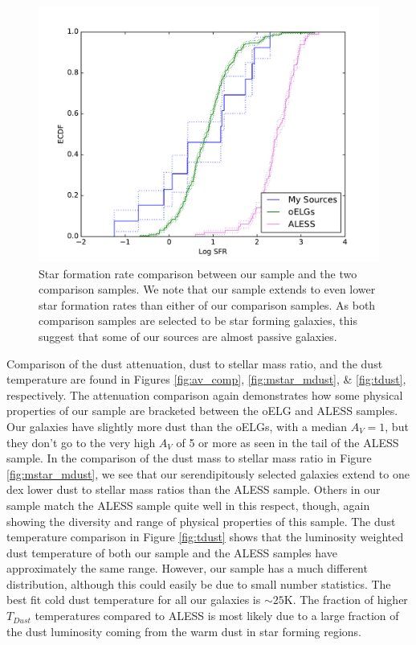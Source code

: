 \documentclass[preprint,natbib209]{aastex}
\begin{document}
\begin{figure}[t]
\centering
\includegraphics[scale=0.8]{ecdf_sfr.pdf}
\caption{Star formation rate comparison between our sample and the two comparison samples. We note that our sample extends to even lower star formation rates than either of our comparison samples. As both comparison samples are selected to be star forming galaxies, this suggest that some of our sources are almost passive galaxies.}
\label{fig:sfr_comp}
\end{figure}

Comparison of the dust attenuation, dust to stellar mass ratio, and the dust temperature are found in Figures \ref{fig:av_comp}, \ref{fig:mstar_mdust}, \& \ref{fig:tdust}, respectively. The attenuation comparison again demonstrates how some physical properties of our sample are bracketed between the oELG and ALESS samples. Our galaxies have slightly more dust than the oELGs, with a median $A_V = 1$, but they don't go to the very high $A_V$ of 5 or more as seen in the tail of the ALESS sample. In the comparison of the dust mass to stellar mass ratio in Figure \ref{fig:mstar_mdust}, we see that our serendipitously selected galaxies extend to one dex lower dust to stellar mass ratios than the ALESS sample. Others in our sample match the ALESS sample quite well in this respect, though, again showing the diversity and range of physical properties of this sample. The dust temperature comparison in Figure \ref{fig:tdust} shows that the luminosity weighted dust temperature of both our sample and the ALESS samples have approximately the same range. However, our sample has a much different distribution, although this could easily be due to small number statistics. The best fit cold dust temperature for all our galaxies is $\sim 25$K. The fraction of higher $T_{Dust}$ temperatures compared to ALESS is most likely due to a large fraction of the dust luminosity coming from the warm dust in star forming regions.
\end{document}

